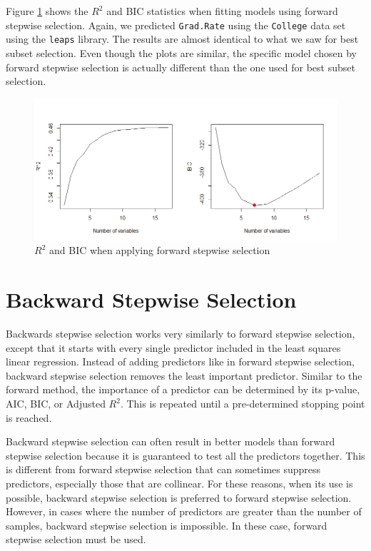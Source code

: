 \documentclass{article}
\begin{document}
Figure \ref{fig:forward-stepwise-selection} shows the $R^2$ and BIC statistics when fitting models using forward stepwise selection. Again, we predicted \lstinline!Grad.Rate! using the \lstinline!College! data set using the \lstinline!leaps! library. The results are almost identical to what we saw for best subset selection. Even though the plots are similar, the specific model chosen by forward stepwise selection is actually different than the one used for best subset selection.

\begin{figure}[!h]
	\label{fig:forward-stepwise-selection}
	\centering
	\caption{$R^2$ and BIC when applying forward stepwise selection}
	\includegraphics[width = 6in]{forward-stepwise-selection.png}
\end{figure}

\section{Backward Stepwise Selection}
Backwards stepwise selection works very similarly to forward stepwise selection, except that it starts with every single predictor included in the least squares linear regression. Instead of adding predictors like in forward stepwise selection, backward stepwise selection removes the least important predictor. Similar to the forward method, the importance of a predictor can be determined by its p-value, AIC, BIC, or Adjusted $R^2$. This is repeated until a pre-determined stopping point is reached.

Backward stepwise selection can often result in better models than forward stepwise selection because it is guaranteed to test all the predictors together. This is different from forward stepwise selection that can sometimes suppress predictors, especially those that are collinear. For these reasons, when its use is possible, backward stepwise selection is preferred to forward stepwise selection. However, in cases where the number of predictors are greater than the number of samples, backward stepwise selection is impossible. In these case, forward stepwise selection must be used.
\end{document}
